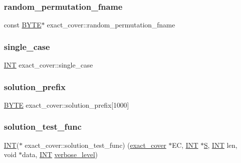 \subsubsection{\texorpdfstring{random\+\_\+permutation\+\_\+fname}{random\_permutation\_fname}}
{\footnotesize\ttfamily const \mbox{\hyperlink{galois_8h_ab6cc7b4aeb6ea31aba2b3fbfc83ff5e6}{B\+Y\+TE}}$\ast$ exact\+\_\+cover\+::random\+\_\+permutation\+\_\+fname}

\mbox{\label{classexact__cover_a8392ddf9f4b8cb1ee6dd3f8b5b143856}} 
\subsubsection{\texorpdfstring{single\+\_\+case}{single\_case}}
{\footnotesize\ttfamily \mbox{\hyperlink{galois_8h_a09fddde158a3a20bd2dcadb609de11dc}{I\+NT}} exact\+\_\+cover\+::single\+\_\+case}

\mbox{\label{classexact__cover_a1d64be8afc172a2c2b88084c9acb873d}} 
\subsubsection{\texorpdfstring{solution\+\_\+prefix}{solution\_prefix}}
{\footnotesize\ttfamily \mbox{\hyperlink{galois_8h_ab6cc7b4aeb6ea31aba2b3fbfc83ff5e6}{B\+Y\+TE}} exact\+\_\+cover\+::solution\+\_\+prefix\mbox{[}1000\mbox{]}}

\mbox{\label{classexact__cover_a9de554975b36905186289a67786cc21f}} 
\subsubsection{\texorpdfstring{solution\+\_\+test\+\_\+func}{solution\_test\_func}}
{\footnotesize\ttfamily \mbox{\hyperlink{galois_8h_a09fddde158a3a20bd2dcadb609de11dc}{I\+NT}}($\ast$ exact\+\_\+cover\+::solution\+\_\+test\+\_\+func) (\mbox{\hyperlink{classexact__cover}{exact\+\_\+cover}} $\ast$EC, \mbox{\hyperlink{galois_8h_a09fddde158a3a20bd2dcadb609de11dc}{I\+NT}} $\ast$\mbox{\hyperlink{simeon_8_c_adab47f8243f1b5a2c31df2535d6b37d0}{S}}, \mbox{\hyperlink{galois_8h_a09fddde158a3a20bd2dcadb609de11dc}{I\+NT}} len, void $\ast$data, \mbox{\hyperlink{galois_8h_a09fddde158a3a20bd2dcadb609de11dc}{I\+NT}} \mbox{\hyperlink{simeon_8_c_a818073fbcc2f439e7c56952f67386122}{verbose\+\_\+level}})}

